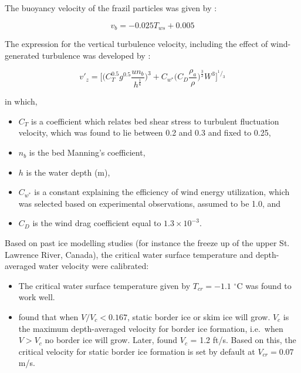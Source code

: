 The buoyancy velocity of the frazil particles was given by \cite{matousek1984types}:

\begin{equation} \label{eq:buoy_vel}
v_b = -0.025 T_{ws} + 0.005
\end{equation}

The expression for the vertical turbulence velocity, including the effect of wind-generated turbulence was developed by \cite{lal1989mathematical}:

\begin{equation} \label{eq:vert_turb_vel}
v'_z = \Bigg[ \bigg( C_T^{0.5} g^{0.5} \frac{un_b}{h^\frac{1}{6}} \bigg) ^{3}+C_{w^*} \bigg(  C_D\frac{\rho_a}{\rho} \bigg) ^\frac{3}{2}W^3 \Bigg]^{^1/_3}
\end{equation}

in which,
\begin{itemize}
    \item $C_T$ is a coefficient which relates bed shear stress to turbulent fluctuation velocity, which was found to lie between 0.2 and 0.3 \cite{rodi1980turbulence} and fixed to 0.25,
    \item $n_b$ is the bed Manning's coefficient,
    \item $h$ is the water depth (m),
    \item $C_{w^*}$ is a constant explaining the efficiency of wind energy utilization, which was selected based on experimental observations, assumed to be 1.0, and
    \item $C_D$ is the wind drag coefficient equal to $1.3 \times 10^{-3}$.
\end{itemize}

\renewcommand{\labelitemi}{\textbullet}
Based on past ice modelling studies (for instance the freeze up of the upper St. Lawrence River, Canada), the critical water surface temperature and depth-averaged water velocity were calibrated:
\begin{itemize}
    \item The critical water surface temperature given by \cite{matousek1984types} $T_{cr} = -1.1$ $^{\circ}$C was found to work well.
    \item \cite{michel1982formation} found that when $V/V_c < 0.167$, static border ice or skim ice will grow. $V_c$ is the maximum depth-averaged velocity for border ice formation, i.e.\ when $V>V_c$ no border ice will grow.\newline
    Later, \cite{shen1984field} found $V_c$ = 1.2 ft/s. Based on this, the critical velocity for static border ice formation is set by default at $V_{cr} = 0.07$ m/s.
\end{itemize}
\renewcommand{\labelitemi}{$\triangleright$}

